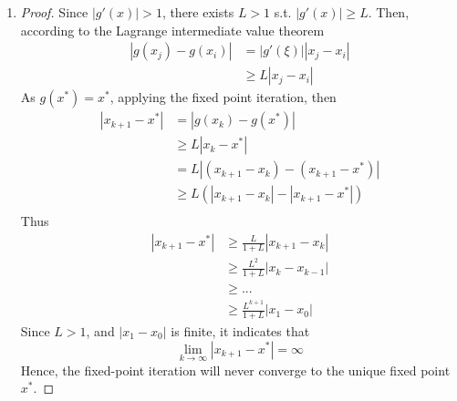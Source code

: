 \documentclass[paper=a4, fontsize=11pt]{scrartcl} %
\numberwithin{equation}{section} %
\numberwithin{figure}{section} %
\numberwithin{table}{section} %
\begin{document}
\begin{enumerate}
		\item 
			\begin{proof}
				Since $|g'(x)|>1$, there exists $L>1$ s.t. $|g'(x)| \geq L$.
				Then, according to the Lagrange intermediate value theorem
				\begin{equation}
					\begin{aligned}
						|g(x_j) - g(x_i)| &= |g'(\xi)||x_j - x_i|\\
										  &\geq L|x_j - x_i|
					\end{aligned}
				\end{equation}
				As $g(x^*) = x^*$, applying the fixed point iteration, then
				\begin{equation}
					\begin{aligned}
					|x_{k+1} - x^*| & = |g(x_k) - g(x^*)|\\
									& \geq L|x_k - x^*|\\
									& = L |(x_{k+1} - x_k)-(x_{k+1}-x^*)|\\
									& \geq L(|x_{k+1} - x_k|-|x_{k+1}-x^*|)\\
					\end{aligned}
				\end{equation}
				Thus
				\begin{equation}
					\begin{aligned}
						|x_{k+1} - x^*| & \geq \frac{L}{1+L} |x_{k+1} - x_k|\\
										& \geq \frac{L^2}{1+L}|x_k - x_{k-1}|\\
										& \geq ...\\
										& \geq \frac{L^{k+1}}{1+L} |x_1 - x_0|
					\end{aligned}
				\end{equation}
						Since $L>1$, and $|x_1 - x_0|$ is finite, it indicates that
				\begin{equation}
				\lim\limits_{k\rightarrow\infty}|x_{k+1} - x^*| = \infty
				\end{equation}
				Hence, the fixed-point iteration will never converge to the unique fixed point $x^*$.
			\end{proof}

		
	\end{enumerate}
\end{document}

